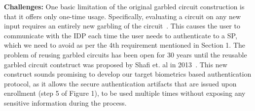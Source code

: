 \documentclass[10pt]{article}
\begin{document}
\textbf{Challenges:}
One basic limitation of the original garbled circuit construction is that it offers only one-time usage. Specifically, evaluating a circuit on any 
new input requires an entirely new garbling of the circuit~\cite{reusablegc}. This causes the user to communicate with the IDP each time the user 
needs to authenticate to a SP, which we need to avoid as per the 4th requirement mentioned in Section 1. The problem of reusing garbled 
circuits has been open for 30 years until the reusable garbled circuit contstruct was proposed by Shafi et. al in 2013~\cite{reusablegc}. This new 
construct sounds promising to develop our target biometrics based authentication protocol, as it allows the secure authentication 
artifacts that are issued upon enrollment (step 5 of Figure 1), to be used multiple times without exposing any sensitive information during the 
process.
\end{document}
